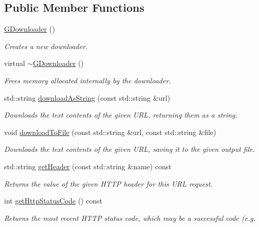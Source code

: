 \subsection*{Public Member Functions}
\begin{DoxyCompactItemize}
\item 
\mbox{\hyperlink{classGDownloader_a03a6336ad3aebf9d5904c50ce0cdc1dc}{G\+Downloader}} ()
\begin{DoxyCompactList}\small\item\em Creates a new downloader. \end{DoxyCompactList}\item 
virtual \mbox{\hyperlink{classGDownloader_a6a9f476cb937e98d417d8ab43b8cd8d5}{$\sim$\+G\+Downloader}} ()
\begin{DoxyCompactList}\small\item\em Frees memory allocated internally by the downloader. \end{DoxyCompactList}\item 
std\+::string \mbox{\hyperlink{classGDownloader_a27b002ce17000e199302c608363c97a2}{download\+As\+String}} (const std\+::string \&url)
\begin{DoxyCompactList}\small\item\em Downloads the text contents of the given U\+RL, returning them as a string. \end{DoxyCompactList}\item 
void \mbox{\hyperlink{classGDownloader_a0bf57f044cc66c8aab40f3f2179caf21}{download\+To\+File}} (const std\+::string \&url, const std\+::string \&file)
\begin{DoxyCompactList}\small\item\em Downloads the text contents of the given U\+RL, saving it to the given output file. \end{DoxyCompactList}\item 
std\+::string \mbox{\hyperlink{classGDownloader_a736d777b29179f52ba753317d84b1087}{get\+Header}} (const std\+::string \&name) const
\begin{DoxyCompactList}\small\item\em Returns the value of the given H\+T\+TP header for this U\+RL request. \end{DoxyCompactList}\item 
int \mbox{\hyperlink{classGDownloader_ab6c069ef77f1319830dcfd90eed6a2ce}{get\+Http\+Status\+Code}} () const
\begin{DoxyCompactList}\small\item\em Returns the most recent H\+T\+TP status code, which may be a successful code (e.\+g. \end{DoxyCompactList}\item 

\end{DoxyCompactItemize}

